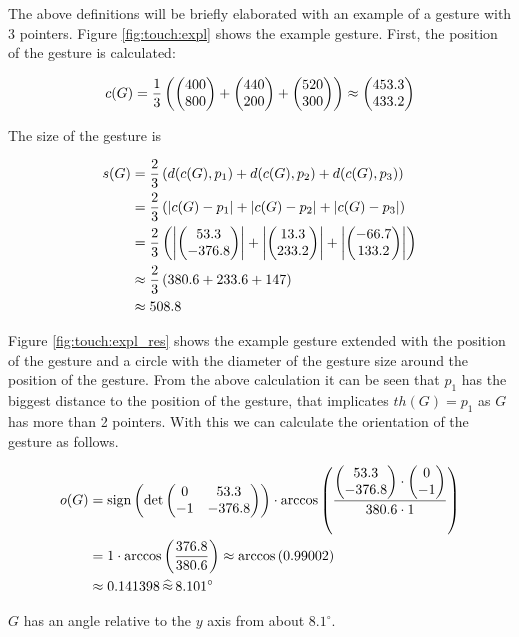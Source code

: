 The above definitions will be briefly elaborated with an example of a gesture with 3 pointers. Figure \ref{fig:touch:expl} shows the example gesture. First, the position of the gesture is calculated:

\begin{equation*}
c(G) = \frac{1}{3}\left( \left( \begin{matrix} 400 \\ 800 \end{matrix} \right) + \left( \begin{matrix} 440 \\ 200 \end{matrix} \right) + \left( \begin{matrix} 520 \\ 300 \end{matrix} \right) \right) \approx \left( \begin{matrix} 453.3 \\ 433.2 \end{matrix} \right)
\end{equation*}

The size of the gesture is

\begin{align*}
s(G) &= \frac{2}{3}\left( d(c(G), p_1) + d(c(G), p_2) + d(c(G), p_3) \right) \\
&= \frac{2}{3}\left( \left|c(G) - p_1\right| + \left| c(G) - p_2 \right| + \left| c(G) - p_3 \right| \right) \\
&= \frac{2}{3}\left( \left| \left( \begin{matrix} 53.3 \\ -376.8 \end{matrix} \right) \right| + \left| \left( \begin{matrix} 13.3 \\ 233.2 \end{matrix} \right) \right| + \left| \left( \begin{matrix} -66.7 \\ 133.2 \end{matrix} \right) \right| \right)	\\
&\approx \frac{2}{3}\left( 380.6 + 233.6 + 147 \right)\\
&\approx 508.8
\end{align*}

Figure \ref{fig:touch:expl_res} shows the example gesture extended with the position of the gesture and a circle with the diameter of the gesture size around the position of the gesture. From the above calculation it can be seen that $p_1$ has the biggest distance to the position of the gesture, that implicates $th(G) = p_1$ as $G$ has more than 2 pointers. With this we can calculate the orientation of the gesture as follows.

\begin{align*}
o(G) &= \text{sign} \left( \det \left( \begin{matrix}
0 & 53.3 \\
-1 & -376.8
\end{matrix} \right) \right) \cdot \arccos\left( \frac{\left( \begin{matrix} 53.3 \\ -376.8 \end{matrix} \right) \cdot \left( \begin{matrix} 0 \\ -1 \end{matrix} \right)}{380.6 \cdot 1} \right) \\
&= 1 \cdot \arccos\left( \frac{376.8}{380.6} \right) 
\approx \arccos\left( 0.99002 \right) \\
&\approx 0.141398 \, \widehat{\approx} \, 8.101 ^\circ
\end{align*}

$G$ has an angle relative to the $y$ axis from about $8.1^\circ$.

